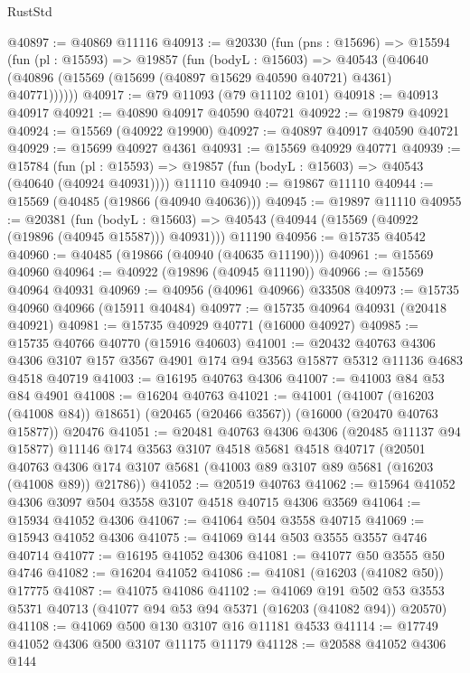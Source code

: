 \begin{lexlean}{RustStd}
\begin{coremodule}
@40897 := @40869 @11116
@40913 := @20330
    (fun (pns : @15696) =>
    @15594
      (fun (pl : @15593) =>
      @19857
        (fun (bodyL : @15603) =>
        @40543 (@40640 (@40896 (@15569 (@15699 (@40897 @15629 @40590 @40721) @4361) @40771))))))
@40917 := @79 @11093 (@79 @11102 @101)
@40918 := @40913 @40917
@40921 := @40890 @40917 @40590 @40721
@40922 := @19879 @40921
@40924 := @15569 (@40922 @19900)
@40927 := @40897 @40917 @40590 @40721
@40929 := @15699 @40927 @4361
@40931 := @15569 @40929 @40771
@40939 := @15784
    (fun (pl : @15593) => @19857 (fun (bodyL : @15603) => @40543 (@40640 (@40924 @40931))))
    @11110
@40940 := @19867 @11110
@40944 := @15569 (@40485 (@19866 (@40940 @40636)))
@40945 := @19897 @11110
@40955 := @20381
    (fun (bodyL : @15603) => @40543 (@40944 (@15569 (@40922 (@19896 (@40945 @15587))) @40931)))
    @11190
@40956 := @15735 @40542
@40960 := @40485 (@19866 (@40940 (@40635 @11190)))
@40961 := @15569 @40960
@40964 := @40922 (@19896 (@40945 @11190))
@40966 := @15569 @40964 @40931
@40969 := @40956 (@40961 @40966) @33508
@40973 := @15735 @40960 @40966 (@15911 @40484)
@40977 := @15735 @40964 @40931 (@20418 @40921)
@40981 := @15735 @40929 @40771 (@16000 @40927)
@40985 := @15735 @40766 @40770 (@15916 @40603)
@41001 := @20432
    @40763
    @4306
    @4306
    @3107
    @157
    @3567
    @4901
    @174
    @94
    @3563
    @15877
    @5312
    @11136
    @4683
    @4518
    @40719
@41003 := @16195 @40763 @4306
@41007 := @41003 @84 @53 @84 @4901
@41008 := @16204 @40763
@41021 := @41001
    (@41007 (@16203 (@41008 @84)) @18651)
    (@20465 (@20466 @3567))
    (@16000 (@20470 @40763 @15877))
    @20476
@41051 := @20481
    @40763
    @4306
    @4306
    (@20485 @11137 @94 @15877)
    @11146
    @174
    @3563
    @3107
    @4518
    @5681
    @4518
    @40717
    (@20501 @40763 @4306 @174 @3107 @5681 (@41003 @89 @3107 @89 @5681 (@16203 (@41008 @89)) @21786))
@41052 := @20519 @40763
@41062 := @15964 @41052 @4306 @3097 @504 @3558 @3107 @4518 @40715 @4306 @3569
@41064 := @15934 @41052 @4306
@41067 := @41064 @504 @3558 @40715
@41069 := @15943 @41052 @4306
@41075 := @41069 @144 @503 @3555 @3557 @4746 @40714
@41077 := @16195 @41052 @4306
@41081 := @41077 @50 @3555 @50 @4746
@41082 := @16204 @41052
@41086 := @41081 (@16203 (@41082 @50)) @17775
@41087 := @41075 @41086
@41102 := @41069
    @191
    @502
    @53
    @3553
    @5371
    @40713
    (@41077 @94 @53 @94 @5371 (@16203 (@41082 @94)) @20570)
@41108 := @41069 @500 @130 @3107 @16 @11181 @4533
@41114 := @17749 @41052 @4306 @500 @3107 @11175 @11179
@41128 := @20588
    @41052
    @4306
    @144

\end{coremodule}
\end{lexlean}

